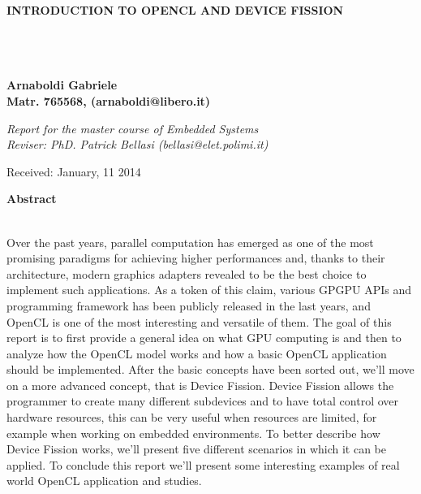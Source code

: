 \documentclass[a4paper,10pt]{article}
\newenvironment*{mytitle}{\begin{LARGE}\bf}{\end{LARGE}\\}%
\newenvironment*{mysubtitle}{\bf}{\\[1.5ex]}%
\newenvironment*{myabstract}{\begin{Large}\bf}{\end{Large}\\[2.5ex]}%
\begin{document}
\nocite{*}
\begin{mytitle}INTRODUCTION TO OPENCL AND DEVICE FISSION\end{mytitle}
\begin{mysubtitle}\end{mysubtitle}
%
%
\\
Arnaboldi Gabriele\\
Matr. 765568, (arnaboldi@libero.it)\\
\hspace{10ex}
\begin{flushright}
\emph{Report for the master course of Embedded Systems}\\
\emph{Reviser: PhD. Patrick Bellasi (bellasi@elet.polimi.it)}
\end{flushright}

Received: January, 11 2014\\
\hspace{10ex}

\begin{myabstract} Abstract \end{myabstract}
{\footnotesize
Over the past years, parallel computation has emerged as one of the most promising paradigms for achieving higher performances and, thanks to their architecture, modern graphics adapters revealed to be the best choice to implement such applications.
As a token of this claim, various GPGPU APIs and programming framework has been publicly released in the last years, and OpenCL is one of the most interesting and versatile of them.
The goal of this report is to first provide a general idea on what GPU computing is and then to analyze how the OpenCL model works and how a basic OpenCL application should be implemented. After the basic concepts have been sorted out, we'll move on a more advanced concept, that is Device Fission.
Device Fission allows the programmer to create many different subdevices and to have total control over hardware resources, this can be very useful when resources are limited, for example when working on embedded environments. To better describe how Device Fission works, we'll present five different scenarios in which it can be applied.
To conclude this report we'll present some interesting examples of real world OpenCL application and studies.}
\end{document}
